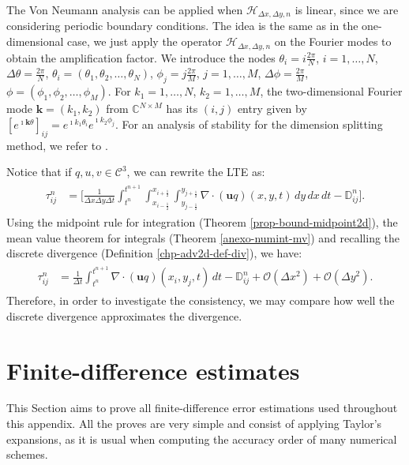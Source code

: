The Von Neumann analysis can be applied when $\mathcal{H}_{\Delta x ,\Delta y,n}$ is linear, since we are considering periodic boundary conditions.
The idea is the same as in the one-dimensional case, we just apply the operator $\mathcal{H}_{\Delta x ,\Delta y,n}$ on the Fourier modes to obtain
the amplification factor.
We introduce the nodes $\theta_i = i\frac{2\pi}{N}$, $i=1, \ldots, N$, $\Delta \theta = \frac{2\pi}{N}$,
$\theta_i = (\theta_1, \theta_2, \ldots, \theta_N)$, $\phi_j = j\frac{2\pi}{M}$, $j=1, \ldots, M$, $\Delta \phi = \frac{2\pi}{M}$,
$\phi = (\phi_1, \phi_2, \ldots, \phi_M)$.
For $k_1=1, \ldots, N$, $k_2=1, \ldots, M$, the two-dimensional Fourier mode $\boldsymbol{k} = (k_1,k_2)$ from $\mathbb{C}^{N\times M}$ 
has its $(i,j)$ entry given by $[e^{\imath \boldsymbol{k} \theta}]_{ij} = e^{\imath k_1 \theta_i}e^{\imath k_2 \phi_j}$. 
For an analysis of stability for the dimension splitting method, we refer to \citet{lin:1996,lauritzen:2007}.

Notice that if $q,u, v \in \mathcal{C}^3$, we can rewrite the LTE as:
\begin{align*}
	\begin{split}
		\tau_{ij}^n &= 
		\bigg[ \frac{1}{\Delta x \Delta y \Delta t}  \int_{t^{n}}^{t^{n+1}}\int_{x_{i-\frac{1}{2}}}^{x_{i+\frac{1}{2}}} 
		\int_{y_{j-\frac{1}{2}}}^{y_{j+\frac{1}{2}}} {\nabla \cdot (\boldsymbol{u}q)}(x, y, t) \,dy \,dx \,dt 
        -\mathbb{D}_{ij}^n
		\bigg].
	\end{split}
\end{align*}
Using the midpoint rule for integration (Theorem \ref{prop-bound-midpoint2d}), the mean value theorem for integrals
(Theorem \ref{anexo-numint-mv}) and recalling the discrete divergence (Definition \ref{chp-adv2d-def-div}), we have:
\begin{align}
	\begin{split}
		\label{consistency-2d-eq}
		\tau_{ij}^n 
		&= \frac{1}{\Delta t}  \int_{t^{n}}^{t^{n+1}}
		{\nabla \cdot (\boldsymbol{u}q)}(x_i, y_j, t)  \,dt - 
		\mathbb{D}^n_{ij} + \mathcal{O}(\Delta x^2) + \mathcal{O}(\Delta y^2).
	\end{split}
\end{align}
Therefore, in order to investigate the consistency, we may compare how well the discrete divergence approximates the divergence.

\section{Finite-difference estimates}
\label{anexo-fd}
This Section aims to prove all finite-difference error estimations 
used throughout this appendix.
All the proves are very simple and consist of applying Taylor's expansions,
as it is usual when computing the accuracy order of many numerical schemes.

